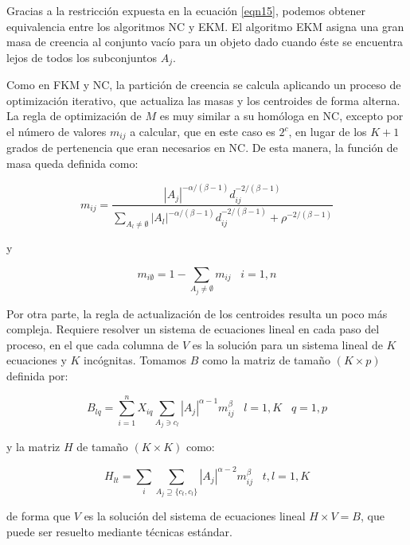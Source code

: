 Gracias a la restricción expuesta en la ecuación \ref{eqn15}, podemos obtener equivalencia entre los algoritmos \acs{NC} y \acs{EKM}. El algoritmo \acs{EKM} asigna una gran masa de creencia al conjunto vacío para un objeto dado cuando éste se encuentra lejos de todos los subconjuntos $A_j$.

Como en \acs{FKM} y \acs{NC}, la partición de creencia se calcula aplicando un proceso de optimización iterativo, que actualiza las masas  y los centroides de forma alterna. La regla de optimización de $M$ es muy similar a su homóloga en \acs{NC}, excepto por el número de valores $m_{ij}$ a calcular, que en este caso es $2^c$, en lugar de los $K + 1$ grados de pertenencia que eran necesarios en \acs{NC}. De esta manera, la función de masa queda definida como:

 \begin{equation}
m_{ij} = \frac{|A_j|^{-\alpha/(\beta-1)} d_{ij}^{-2/(\beta-1)}}{\sum_{A_l \ne \emptyset}|A_l|^{-\alpha/(\beta-1)} d_{ij}^{-2/(\beta-1)} + \rho^{-2/(\beta-1)}}
 \label{eqn16}
 \end{equation}
 
 y
 
\begin{equation}
m_{i\emptyset} = 1 - \sum_{A_j \ne \emptyset}m_{ij} \;\;\; i = 1,n
\label{eqn17}
\end{equation}

Por otra parte, la regla de actualización de los centroides resulta un poco más compleja. Requiere resolver un sistema de ecuaciones lineal en cada paso del proceso, en el que cada columna de $V$ es la solución para un sistema lineal de $K$ ecuaciones y $K$ incógnitas. Tomamos $B$ como la matriz de tamaño $(K \times p)$ definida por:

\begin{equation}
B_{lq} = \sum_{i=1}^{n} X_{iq} \sum_{A_j \ni c_l} |A_j|^{\alpha-1} m_{ij}^\beta \;\;\; l = 1,K \;\;\; q =1,p
\label{eqn18}
\end{equation}

y la matriz $H$ de tamaño $(K \times K)$ como:

\begin{equation}
H_{lt} = \sum_{i} \sum_{A_j \supseteq \{c_t,c_l\}} |A_j|^{\alpha - 2} m_{ij}^\beta \;\;\; t,l = 1,K
\label{eqn20}
\end{equation}

de forma que $V$ es la solución del sistema de ecuaciones lineal $H\times V = B$, que puede ser resuelto mediante técnicas estándar.

